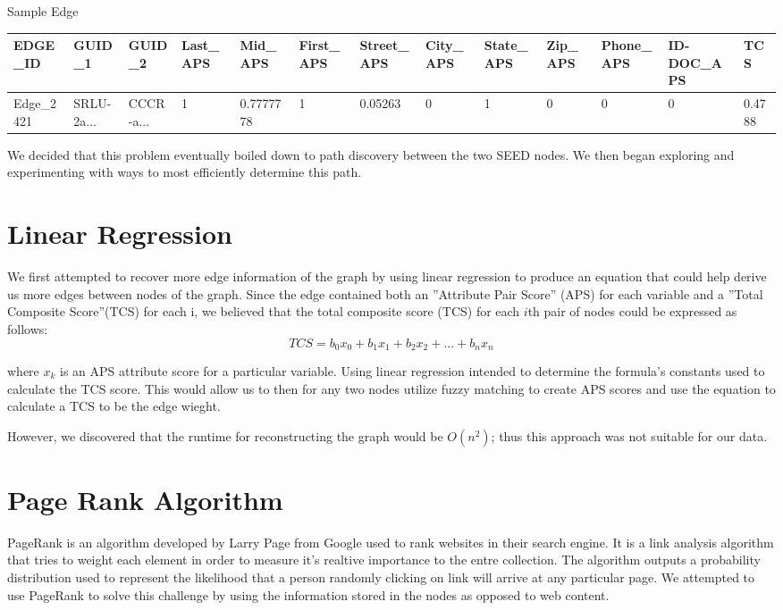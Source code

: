 \documentclass{article} %
\begin{document}
Sample Edge

\begin{table}[h]
\tiny
\begin{tabular}{|l|l|l|l|l|l|l|l|l|l|l|l|l|}
\hline
\textbf{EDGE\_ID} & \textbf{GUID\_1} & \textbf{GUID\_2} & \textbf{Last\_APS} & \textbf{Mid\_APS} & \textbf{First\_APS} & \textbf{Street\_APS} & \textbf{City\_APS} & \textbf{State\_APS} & \textbf{Zip\_APS} & \textbf{Phone\_APS} & \textbf{ID-DOC\_APS} & \textbf{TCS} \\ \hline
Edge\_2421 & SRLU-2a... & CCCR-a... & 1 & 0.7777778 & 1 & 0.05263 & 0 & 1 & 0 & 0 & 0 & 0.4788 \\ \hline
\end{tabular}
\end{table}

We decided that this problem eventually boiled down to path discovery between the two SEED nodes. We then began exploring and experimenting with ways to most efficiently determine this path.

\section{Linear Regression}

We first attempted to recover more edge information of the graph by using linear regression to produce an equation that could help derive us more edges between nodes of the graph. Since the edge contained both an ''Attribute Pair Score'' (APS) for each variable and a ''Total Composite Score''(TCS) for each i, we believed that the total composite score (TCS) for each $i$th pair of nodes could be expressed as follows:
\[
TCS = b_0x_0 + b_1x_1 + b_2x_2 + ... + b_nx_n
\]

where $x_k$ is an APS attribute score for a particular variable. Using linear regression intended to determine the formula's constants used to calculate the TCS score. This would allow us to then for any two nodes utilize fuzzy matching to create APS scores and use the equation to calculate a TCS to be the edge wieght.

However, we discovered that the runtime for reconstructing the graph would be $O(n^2)$; thus this approach was not suitable for our data.


\section{Page Rank Algorithm}

PageRank is an algorithm developed by Larry Page  from Google used to rank websites in their search engine. It is a link analysis algorithm that tries to weight each element in order to measure it's realtive importance to the entre collection. The algorithm outputs a probability distribution used to represent the likelihood that a person randomly clicking on link will arrive at any particular page. We attempted to use PageRank to solve this challenge by using the information stored in the nodes as opposed to web content.
\end{document}
